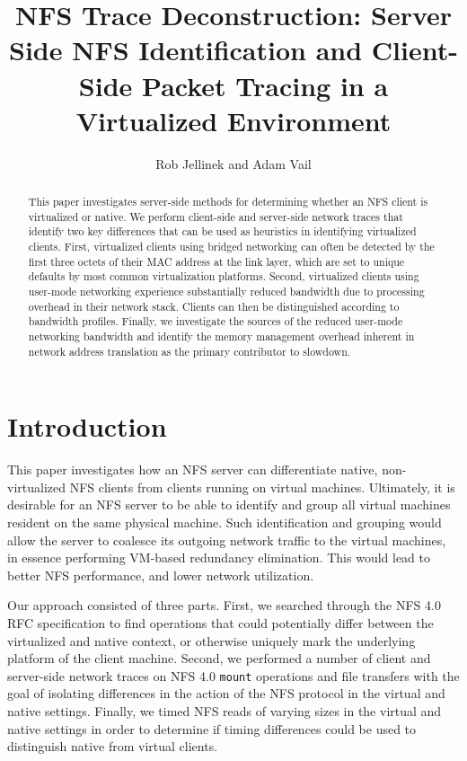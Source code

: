 \documentclass[letterpaper,twocolumn,11pt]{article}
\title{NFS Trace Deconstruction: 
Server Side NFS Identification and Client-Side Packet Tracing in a Virtualized Environment}
\author{Rob Jellinek and Adam Vail}
\begin{document}
\maketitle

\begin{abstract}
This paper investigates server-side methods for determining whether an NFS client is virtualized or native. We perform client-side and server-side network traces that identify two key differences that can be used as heuristics in identifying virtualized clients. First, virtualized clients using bridged networking can often be detected by the first three octets of their MAC address at the link layer, which are set to unique defaults by most common virtualization platforms. Second, virtualized clients using user-mode networking experience substantially reduced bandwidth due to processing overhead in their network stack. Clients can then be distinguished according to bandwidth profiles. Finally, we investigate the sources of the reduced user-mode networking bandwidth and identify the memory management overhead inherent in network address translation as the primary contributor to slowdown.
\end{abstract}

\section{Introduction}
This paper investigates how an NFS server can differentiate native, non-virtualized NFS clients from clients running on virtual machines. 
Ultimately, it is desirable for an NFS server to be able to identify and group all virtual machines resident on the same physical machine. Such identification and grouping would allow the server to coalesce its outgoing network traffic to the virtual machines, in essence performing VM-based redundancy elimination. This would lead to better NFS performance, and lower network utilization.

Our approach consisted of three parts. First, we searched through the NFS 4.0 RFC specification \cite{shepler2003network} to find operations that could potentially differ between the virtualized and native context, or otherwise uniquely mark the underlying platform of the client machine. Second, we performed a number of client and server-side network traces on NFS 4.0 \texttt{mount} operations and file transfers with the goal of isolating differences in the action of the NFS protocol in the virtual and native settings. Finally, we timed NFS reads of varying sizes in the virtual and native settings in order to determine if timing differences could be used to distinguish native from virtual clients. 
\end{document}
